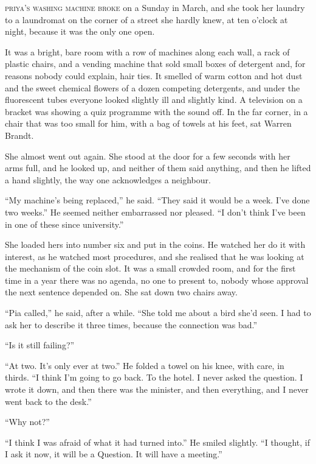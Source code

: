 
\textsc{priya's washing machine broke} on a Sunday in March, and she took her laundry to a laundromat on the corner of a street she hardly knew, at ten o'clock at night, because it was the only one open.

It was a bright, bare room with a row of machines along each wall, a rack of plastic chairs, and a vending machine that sold small boxes of detergent and, for reasons nobody could explain, hair ties. It smelled of warm cotton and hot dust and the sweet chemical flowers of a dozen competing detergents, and under the fluorescent tubes everyone looked slightly ill and slightly kind. A television on a bracket was showing a quiz programme with the sound off. In the far corner, in a chair that was too small for him, with a bag of towels at his feet, sat Warren Brandt.

She almost went out again. She stood at the door for a few seconds with her arms full, and he looked up, and neither of them said anything, and then he lifted a hand slightly, the way one acknowledges a neighbour.

``My machine's being replaced,'' he said. ``They said it would be a week. I've done two weeks.'' He seemed neither embarrassed nor pleased. ``I don't think I've been in one of these since university.''

She loaded hers into number six and put in the coins. He watched her do it with interest, as he watched most procedures, and she realised that he was looking at the mechanism of the coin slot. It was a small crowded room, and for the first time in a year there was no agenda, no one to present to, nobody whose approval the next sentence depended on. She sat down two chairs away.

``Pia called,'' he said, after a while. ``She told me about a bird she'd seen. I had to ask her to describe it three times, because the connection was bad.''

``Is it still failing?''

``At two. It's only ever at two.'' He folded a towel on his knee, with care, in thirds. ``I think I'm going to go back. To the hotel. I never asked the question. I wrote it down, and then there was the minister, and then everything, and I never went back to the desk.''

``Why not?''

``I think I was afraid of what it had turned into.'' He smiled slightly. ``I thought, if I ask it now, it will be a Question. It will have a meeting.''

